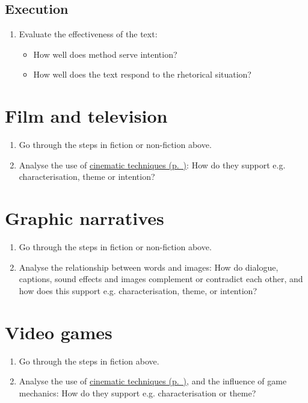 \documentclass[11pt,a4paper,oneside]{book}
\begin{document}
\subsection*{Execution}

\begin{enumerate}
\item Evaluate the effectiveness of the text:

\begin{itemize}
\item How well does method serve intention?
\item How well does the text respond to the rhetorical situation?
\end{itemize}

\end{enumerate}

\section*{Film and television}

\begin{enumerate}
\item Go through the steps in fiction or non-fiction above.
\item Analyse the use of \hyperref[note-cinematic-techniques]{cinematic techniques (p.~\pageref*{note-cinematic-techniques})}: How do they support e.g. characterisation, theme or intention?
\end{enumerate}

\section*{Graphic narratives}

\begin{enumerate}
\item Go through the steps in fiction or non-fiction above.
\item Analyse the relationship between words and images: How do dialogue, captions, sound effects and images complement or contradict each other, and how does this support e.g. characterisation, theme, or intention?
\end{enumerate}

\section*{Video games}

\begin{enumerate}
\item Go through the steps in fiction above.
\item Analyse the use of \hyperref[note-cinematic-techniques]{cinematic techniques (p.~\pageref*{note-cinematic-techniques})}, and the influence of game mechanics: How do they support e.g. characterisation or theme?
\end{enumerate}
\end{document}

